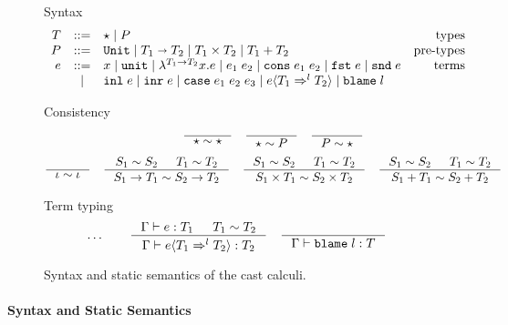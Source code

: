 \documentclass[acmsmall,review,anonymous]{acmart}\settopmatter{printfolios=true,printccs=false,printacmref=false}
\newcommand{\stxrule}[3]{#1 & ::= & #3 & \text{#2}\\}
\newcommand{\stxrulecont}[1]{& | & #1 & \\}
\newcommand{\plus}[0]{+}
\newcommand{\judgetype}[3]{#1 \vdash #2 : #3}
\newcommand{\POOunit}[0]{\mathtt{Unit}}
\newcommand{\POOfun}[2]{#1 \shortrightarrow #2}
\newcommand{\POOprod}[2]{#1 \times #2}
\newcommand{\POOsum}[2]{#1 \plus #2}
\newcommand{\eOOvar}[1]{#1}
\newcommand{\eOOsole}[0]{\mathtt{unit}}
\newcommand{\eOOlam}[4]{\lambda^{#1\rightarrow{}#2}#3.#4}
\newcommand{\eOOapp}[2]{#1 \; #2}
\newcommand{\eOOcons}[2]{\mathtt{cons} \; #1 \; #2}
\newcommand{\eOOcar}[1]{\mathtt{fst} \; #1}
\newcommand{\eOOcdr}[1]{\mathtt{snd} \; #1}
\newcommand{\eOOinl}[1]{\mathtt{inl} \; #1}
\newcommand{\eOOinr}[1]{\mathtt{inr} \; #1}
\newcommand{\eOOcase}[3]{\mathtt{case} \; #1 \; #2 \; #3}
\newcommand{\eOOcast}[4]{#1 \langle \cOOcast{#2}{#3}{#4} \rangle}
\newcommand{\eOOblame}[1]{\mathtt{blame} \; #1}
\newcommand{\cOOcast}[3]{#1 \Rightarrow^{#2} #3}
\begin{document}
\begin{figure}
	Syntax
	\[
	\begin{array}{rclr}
	\stxrule{T}{types}{
		\star \mid{}
		P
	}
	\stxrule{P}{pre-types}{
		\POOunit \mid
		\POOfun{T_1}{T_2} \mid
		\POOprod{T_1}{T_2} \mid
		\POOsum{T_1}{T_2}
	}
	\stxrule{e}{terms}{
		\eOOvar{x} \mid{}
		\eOOsole{} \mid{}
		\eOOlam{T_1}{T_2}{x}{e} \mid
		\eOOapp{e_1}{e_2} \mid
		\eOOcons{e_1}{e_2} \mid
		\eOOcar{e} \mid
		\eOOcdr{e}
	}
	\stxrulecont{
		\eOOinl{e} \mid
		\eOOinr{e} \mid
		\eOOcase{e_1}{e_2}{e_3} \mid
		\eOOcast{e}{T_1}{l}{T_2} \mid
		\eOOblame{l}
	}
	\end{array}
	\]
	
	Consistency
	\begin{gather*}
	\inference{}{
		\star \sim \star
	} \quad
	\inference{}{
		\star \sim P
	} \quad
	\inference{}{
		P \sim \star
	} \\[1ex]
	\inference{}{
		\iota \sim \iota
	} \quad
	\inference{
		S_1 \sim S_2 &
		T_1 \sim T_2
	}{
		S_1 \rightarrow T_1 \sim S_2 \rightarrow T_2
	} \quad
	\inference{
		S_1 \sim S_2 &
		T_1 \sim T_2
	}{
		S_1 \times T_1 \sim S_2 \times T_2
	} \quad
	\inference{
		S_1 \sim S_2 &
		T_1 \sim T_2
	}{
		S_1 \plus T_1 \sim S_2 \plus T_2
	}
	\end{gather*}
	
	Term typing
	\fbox{$ \judgetype{\Gamma}{e}{T} $}
	\begin{gather*}
          \dots \qquad
		\inference{
			\Gamma \vdash e : T_1 & T_1 \sim T_2
		}{
			\judgetype{\Gamma}{\eOOcast{e}{T_1}{l}{T_2}}{T_2}
		} \quad
		\inference{
		}{
			\judgetype{\Gamma}{\eOOblame{l}}{T}
		}
	\end{gather*}
	
	\caption{Syntax and static semantics of the cast calculi.}
	\label{fig:blame-static}
\end{figure}


\paragraph{Syntax and Static Semantics}
\end{document}
